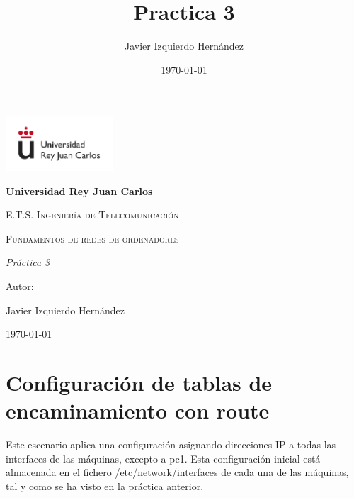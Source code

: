 \documentclass[12pt, a4paper]{report}
\title{Practica 3}
\author{Javier Izquierdo Hernández}
\date{\today}
\begin{document}
	\begin{titlepage}
		\centering
		{\includegraphics[width=0.3\textwidth]{logo}\par}
		\vspace{1cm}
		{\bfseries\LARGE Universidad Rey Juan Carlos \par}
		\vspace{1cm}
		{\scshape\Large E.T.S. Ingeniería de Telecomunicación \par}
		\vspace{3cm}
		{\scshape\Huge Fundamentos de redes de ordenadores \par}
		\vspace{3cm}
		{\itshape\Large Práctica 3 \par}
		\vfill
		{\Large Autor: \par}
		{\Large Javier Izquierdo Hernández \par}
		\vfill
		{\Large \today \par}
	\end{titlepage}

\newpage
\renewcommand{\contentsname}{Contenidos}
\tableofcontents
\newpage
\chapter{Configuración de tablas de encaminamiento con route}
Este escenario aplica una configuración asignando direcciones IP a todas las interfaces de las máquinas, excepto a pc1.
Esta configuración inicial está almacenada en el fichero
/etc/network/interfaces de cada una de las máquinas, tal y como se ha visto en la práctica anterior.
\newline
\end{document}
